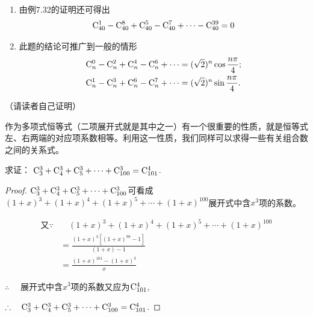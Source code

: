\begin{remark}
\begin{enumerate}
    \item 由例7.32的证明还可得出
\[\comb{40}{1}-\comb{40}{8}+\comb{40}{5}-\comb{40}{7}+\cdots -\comb{40}{39}=0\]
\item 此题的结论可推广到一般的情形
\[\begin{split}
    \comb{n}{0}-\comb{n}{2}+\comb{n}{4}-\comb{n}{6}+\cdots  &=(\sqrt{2})^{n}\cos\frac{n\pi }{4};\\
\comb{n}{1}-\comb{n}{3}+\comb{n}{6}-\comb{n}{7}+\cdots &=(\sqrt{2})^{n}\sin\frac{n\pi }{4}.
\end{split}\]
\end{enumerate}
（请读者自己证明）
\end{remark}

作为多项式恒等式（二项展开式就是其中之一）有一个很重要的性质，就是恒等式左、右两端的对应项系数相等。利用这一性质，我们同样可以求得一些有关组合数之间的关系式。

\begin{example}
    求证： $\comb{3}{3}+\comb{4}{3}+\comb{5}{3}+\cdots +\comb{100}{3}=\comb{101}{4}$.
\end{example}

\begin{proof}
$\comb{3}{3}+\comb{4}{3}+\comb{5}{3}+\cdots +\comb{100}{3} $可看成$ (1+x)^{3}+(1+x)^{4} +(1+x)^{5}+\cdots +(1+x)^{100} $展开式中含$ x^{3} $项的系数。

\[\begin{split}
    \text{又}\because &\quad (1+x)^{3}+(1+x)^{4}+(1+x)^{5}+\cdots +(1+x)^{100}\\
&=\frac{(1+x)^{3}[(1+x)^{98}-1]}{(1+x)-1}\\
&=\frac{(1+x)^{101}-(1+x)^{3}}{x}
\end{split}\]

$\therefore\quad$ 展开式中含$ x^{3} $项的系数又应为$ \comb{101}{4}$,

$\therefore\quad \comb{3}{3}+\comb{4}{3}+\comb{5}{3}+\cdots +\comb{100}{3}=\comb{101}{4}$.
\end{proof}

